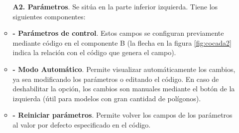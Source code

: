 \begin{itemize}
\begin{itemize}
\textbf{A2. Parámetros}. Se sitúa en la parte inferior izquierda. Tiene los siguientes componentes:\\
        \item \textbf{- Parámetros de control}.
        Estos campos se configuran previamente mediante código en el componente B (la flecha en la figura \ref{fig:cocada2} indica la relación con el código que genera el campo).\\
        \item \textbf{- Modo Automático}. Permite visualizar automáticamente los cambios, ya sea modificando los parámetros o editando el código. En caso de deshabilitar la opción, los cambios son manuales mediante el botón de la izquierda (útil para modelos con gran cantidad de polígonos). \\
        \item \textbf{- Reiniciar parámetros}. Permite volver los campos de los parámetros al valor por defecto especificado en el código.\\
        
\end{itemize}


\end{itemize}


